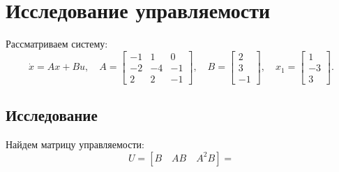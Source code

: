 \section{Исследование управляемости}

Рассматриваем систему:
\begin{equation*}
    \dot x=Ax+Bu,\quad
    A=\begin{bmatrix}
        -1 & 1 & 0 \\ -2 & -4 & -1 \\ 2 & 2 & -1
    \end{bmatrix},\quad
    B=\begin{bmatrix}
        2 \\ 3 \\ -1
    \end{bmatrix},\quad
    x_1=\begin{bmatrix}
        1 \\ -3 \\ 3
    \end{bmatrix}.
\end{equation*}

\subsection{Исследование}

Найдем матрицу управляемости:
\begin{equation*}
    U=[B\quad AB\quad A^2B]=
\end{equation*}